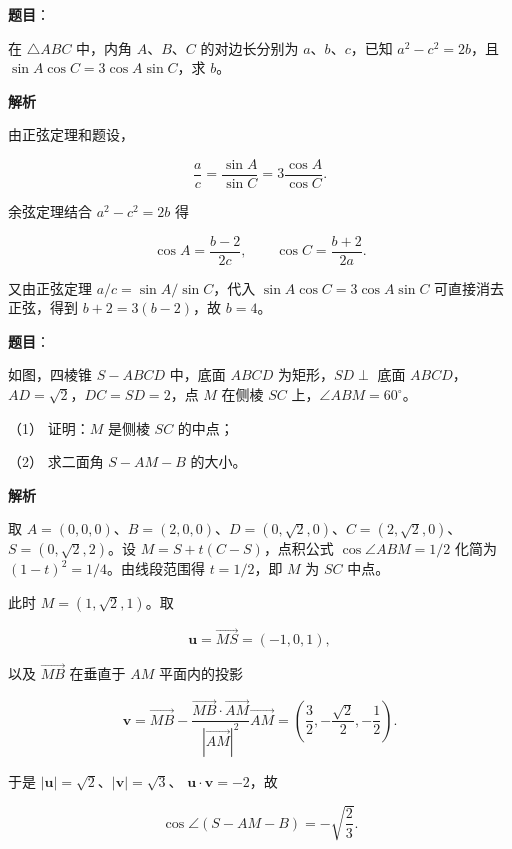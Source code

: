 \begin{answer}

\textbf{题目}：

在 $\triangle ABC$ 中，内角 $A\text{、}B\text{、}C$ 的对边长分别为 $a\text{、}b\text{、}c$，已知 $a^2-c^2=2b$，且 $\sin A\cos C=3\cos A\sin C$，求 $b$。

\textbf{解析}

由正弦定理和题设，

\nopagebreak[4]
\[
\frac ac=\frac{\sin A}{\sin C}
=3\frac{\cos A}{\cos C}.
\]

余弦定理结合 $a^2-c^2=2b$ 得

\nopagebreak[4]
\[
\cos A=\frac{b-2}{2c},\qquad
\cos C=\frac{b+2}{2a}.
\]

又由正弦定理 $a/c=\sin A/\sin C$，代入
$\sin A\cos C=3\cos A\sin C$ 可直接消去正弦，得到
$b+2=3(b-2)$，故 $b=4$。


\end{answer}
\begin{answer}

\textbf{题目}：

如图，四棱锥 $S-ABCD$ 中，底面 $ABCD$ 为矩形，$SD\perp$ 底面 $ABCD$，$AD=\sqrt2$，$DC=SD=2$，点 $M$ 在侧棱 $SC$ 上，$\angle ABM=60^\circ$。
\nopagebreak[4]
\begin{center}\end{center}
\nopagebreak[4]
（1） 证明：$M$ 是侧棱 $SC$ 的中点；

（2） 求二面角 $S-AM-B$ 的大小。

\textbf{解析}


取
$A=(0,0,0)$、$B=(2,0,0)$、$D=(0,\sqrt2,0)$、$C=(2,\sqrt2,0)$、
$S=(0,\sqrt2,2)$。设 $M=S+t(C-S)$，点积公式
$\cos\angle ABM=1/2$ 化简为 $(1-t)^2=1/4$。由线段范围得
$t=1/2$，即 $M$ 为 $SC$ 中点。


此时 $M=(1,\sqrt2,1)$。取

\nopagebreak[4]
\[
\boldsymbol u=\overrightarrow{MS}=(-1,0,1),
\]

以及 $\overrightarrow{MB}$ 在垂直于 $AM$ 平面内的投影

\nopagebreak[4]
\[
\boldsymbol v=\overrightarrow{MB}
-\frac{\overrightarrow{MB}\cdot\overrightarrow{AM}}
{|\overrightarrow{AM}|^2}\overrightarrow{AM}
=\left(\frac32,-\frac{\sqrt2}{2},-\frac12\right).
\]

于是 $|\boldsymbol u|=\sqrt2$、$|\boldsymbol v|=\sqrt3$、
$\boldsymbol u\cdot\boldsymbol v=-2$，故

\nopagebreak[4]
\[
\cos\angle(S-AM-B)=-\sqrt{\frac23}.
\]



\end{answer}
